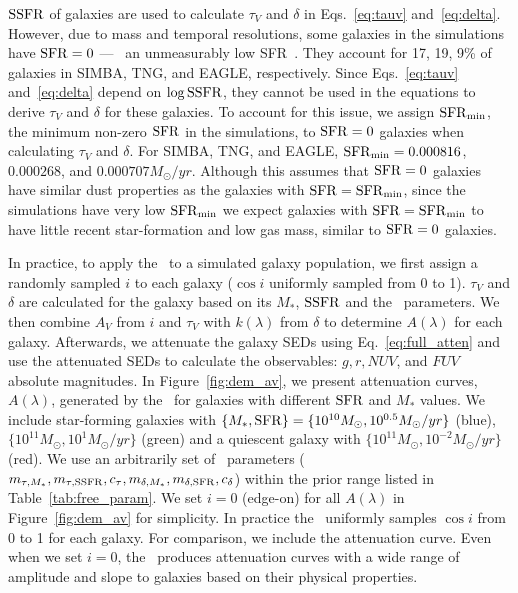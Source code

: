

${\rm SSFR}$ of galaxies are used to calculate $\tau_V$ and $\delta$ in
Eqs.~\ref{eq:tauv} and~\ref{eq:delta}. However, due to mass and temporal resolutions,
some galaxies in the simulations have ${\rm SFR}=0$ --- \ie~an unmeasurably low
SFR~\citep{hahn2019c}. They account for 17, 19, 9\% of galaxies
in SIMBA, TNG, and EAGLE, respectively. Since Eqs.~\ref{eq:tauv}
and~\ref{eq:delta} depend on $\log{\rm SSFR}$, they cannot be used in the equations
to derive $\tau_V$ and $\delta$ for these galaxies. To account for this issue,
we assign ${\rm SFR}_{\rm min}$, the minimum non-zero ${\rm SFR}$ in the simulations, to
${\rm SFR}=0$ galaxies when calculating $\tau_V$ and $\delta$. For SIMBA, TNG, and
EAGLE, ${\rm SFR}_{\rm min}=0.000816$, $0.000268$, and $0.000707 M_\odot/yr$. Although 
this assumes that ${\rm SFR}=0$ galaxies have similar dust properties as the galaxies 
with ${\rm SFR} = {\rm SFR}_{\rm min}$, since the simulations have very low ${\rm SFR}_{\rm min}$ 
we expect galaxies with ${\rm SFR} = {\rm SFR}_{\rm min}$ to have little recent
star-formation and low gas mass, similar to ${\rm SFR}=0$ galaxies. 


In practice, to apply the \eda~to a simulated galaxy population, we first
assign a randomly sampled $i$ to each galaxy ($\cos i$ uniformly sampled from 0 to 1).
$\tau_V$ and $\delta$ are calculated for
the galaxy based on its $M_*$,
${\rm SSFR}$ and the \eda~parameters. We then combine $A_V$ from $i$ and
$\tau_V$ with $k(\lambda)$ from $\delta$ to determine $A(\lambda)$ for each
galaxy.
Afterwards, we attenuate the galaxy SEDs using Eq.~\ref{eq:full_atten} and use
the attenuated SEDs to calculate the observables: $g, r, NUV$, and $FUV$
absolute magnitudes. 
In Figure~\ref{fig:dem_av}, we present attenuation curves, $A(\lambda)$,
generated by the \eda~for galaxies with different ${\rm SFR}$ and $M_*$ values.  
We include star-forming galaxies with $\{M_*, {\rm SFR}\} = \{10^{10}M_\odot,
10^{0.5}M_\odot/yr\}$ (blue), $\{10^{11}M_\odot, 10^{1} M_\odot/yr\}$
(green) and a quiescent galaxy with $\{10^{11}M_\odot, 10^{-2}M_\odot/yr\}$
(red).
We use an arbitrarily set of \eda~parameters ($m_{\tau,M_*}, m_{\tau,{\rm SSFR}}, c_\tau,
m_{\delta,M_*}, m_{\delta,{\rm SFR}}, c_\delta$) within the prior range listed in
Table~\ref{tab:free_param}. 
We set $i=0$ (edge-on) for all $A(\lambda)$ in Figure~\ref{fig:dem_av} for
simplicity.
In practice the \eda~uniformly samples $\cos i$ from 0 to 1 for each galaxy.
For comparison, we include the \cite{calzetti2001} attenuation curve. Even when
we set $i=0$, the \eda~produces attenuation curves with a wide range
of amplitude and slope to galaxies based on their physical properties. 

